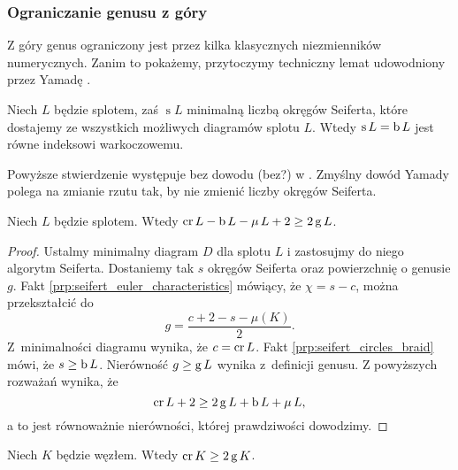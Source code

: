 
\subsubsection{Ograniczanie genusu z góry}
Z góry genus ograniczony jest przez kilka klasycznych niezmienników numerycznych.
Zanim to pokażemy, przytoczymy techniczny lemat udowodniony przez Yamadę \cite{yamada87}.
%

\begin{proposition}
%
\label{prp:seifert_circles_braid}%
    Niech $L$ będzie splotem, zaś $\operatorname{s} L$ minimalną liczbą okręgów Seiferta, które dostajemy ze wszystkich możliwych diagramów splotu $L$.
    Wtedy $\operatorname{s} L = \operatorname{b} L$ jest równe indeksowi warkoczowemu.
\end{proposition}

Powyższe stwierdzenie występuje bez dowodu (bez?) w \cite[s. 17]{kawauchi96}.
Zmyślny dowód Yamady polega na zmianie rzutu tak, by nie zmienić liczby okręgów Seiferta.

\begin{proposition}
    Niech $L$ będzie splotem.
    Wtedy $\operatorname{cr} L - \operatorname{b} L - \operatorname{\mu} L + 2 \ge 2 \operatorname{g} L$.
\end{proposition}

\begin{proof}
    Ustalmy minimalny diagram $D$ dla splotu $L$ i zastosujmy do niego algorytm Seiferta.
    Dostaniemy tak $s$ okręgów Seiferta oraz powierzchnię o genusie $g$.
    Fakt \ref{prp:seifert_euler_characteristics} mówiący, że $\chi = s - c$, można przekształcić do
    \begin{equation}
        g = \frac{c + 2 - s - \mu(K)}{2}.
    \end{equation}
    Z~minimalności diagramu wynika, że $c = \operatorname{cr} L$.
    Fakt \ref{prp:seifert_circles_braid} mówi, że $s \ge \operatorname{b} L$.
    Nierówność $g \ge \operatorname{g} L$ wynika z~definicji genusu.
    Z powyższych rozważań wynika, że
    \begin{equation}
        \operatorname{cr} L + 2 \ge 2 \operatorname{g} L + \operatorname{b} L + \operatorname{\mu} L,
    \end{equation}
    a to jest równoważnie nierówności, której prawdziwości dowodzimy.
\end{proof}

\begin{corollary}
%
\label{cor:crossing_genus}%
    Niech $K$ będzie węzłem.
    Wtedy $\operatorname{cr} K \ge 2 \operatorname{g} K$.
\end{corollary}



